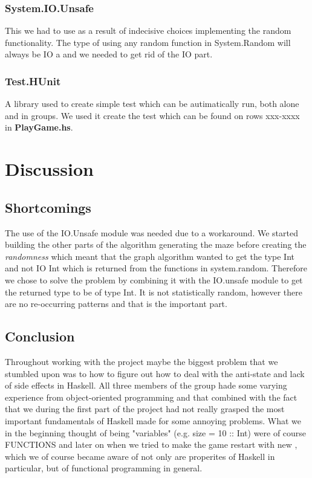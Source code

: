 \documentclass[12pt, a4paper]{article}
\begin{document}
\subsubsection*{System.IO.Unsafe}
This we had to use as a result of indecisive choices implementing the random functionality. The type of using any random function in System.Random will always be IO a and we needed to get rid of the IO part.\cite{IO.Unsafe}


\subsubsection*{Test.HUnit}
A library used to create simple test which can be autimatically run, both alone and in groups. We used it create the test which can be found on rows xxx-xxxx in \textbf{PlayGame.hs}. \cite{HUnit}

\newpage
\section{Discussion}
\subsection{Shortcomings}
The use of the IO.Unsafe module was needed due to a workaround. We started building the other parts of the algorithm generating the maze before creating the \textit{randomness} which meant that the graph algorithm wanted to get the type Int and not IO Int which is returned from the functions in system.random. Therefore we chose to solve the problem by combining it with the IO.unsafe module to get the returned type to be of type Int. It is not statistically random, however there are no re-occurring patterns and that is the important part.








\subsection{Conclusion}
Throughout working with the project maybe the biggest problem that we stumbled upon was to how to figure out how to deal with the anti-state and lack of side effects in Haskell. All three members of the group hade some varying experience from object-oriented programming and that combined with the fact that we during the first part of the project had not really grasped the most important fundamentals of Haskell made for some annoying problems. What we in the beginning thought of being "variables" (e.g. size = 10 :: Int) were of course FUNCTIONS and later on when we tried to make the game restart with new , which we of course became aware of not only are properites of Haskell in particular, but of functional programming in general. 
\end{document}
